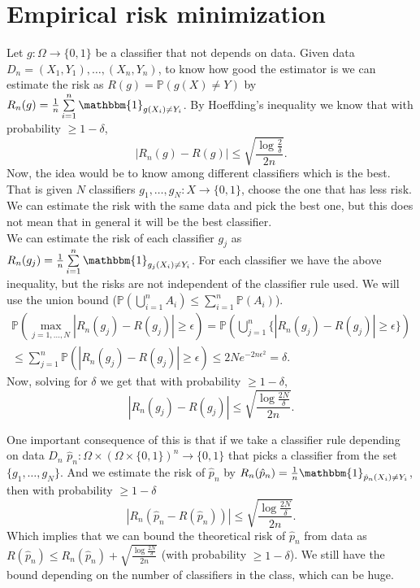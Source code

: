 \documentclass[11pt, english]{article}
\begin{document}
\section{Empirical risk minimization}

Let $g:\Omega\rightarrow\{0,1\}$ be a classifier that not depends on data. Given data $D_n=(X_1,Y_1),\dots,(X_n,Y_n)$, to know how good the estimator is we can estimate the risk as $R(g)=\mathbb{P}(g(X)\neq Y)$ by $R_n(g)=\frac{1}{n}\sum\limits_{i=1}^n\mathbbm{1}_{g(X_i)\neq Y_i}$. By Hoeffding's inequality we know that with probability $\geq 1-\delta$, 
\begin{equation}
	|R_n(g)-R(g)|\leq\sqrt{\frac{\log\frac{2}{\delta}}{2n}}.
\end{equation}
Now, the idea would be to know among different classifiers which is the best. That is given $N$ classifiers $g_1,\dots,g_N: X\rightarrow\{0,1\}$, choose the one that has less risk. We can estimate the risk with the same data and pick the best one, but this does not mean that in general it will be the best classifier.\\

We can estimate the risk of each classifier $g_j$ as $R_n(g_j)=\frac{1}{n}\sum\limits_{i=1}^n \mathbbm{1}_{g_j(X_i)\neq Y_i}$. For each classifier we have the above inequality, but the risks are not independent of the classifier rule used. We will use the union bound ($\mathbb{P}(\bigcup\limits_{i=1}^n A_i)\leq\sum\limits_{i=1}^n\mathbb{P}(A_i)$).
\begin{align}
	\mathbb{P}(\underset{j=1,\dots,N}{\max}|R_n(g_j)-R(g_j)|\geq\epsilon)=\mathbb{P}(\bigcup\limits_{j=1}^n\{|R_n(g_j)-R(g_j)|\geq \epsilon\})\\
	\leq\sum\limits_{j=1}^n\mathbb{P}(|R_n(g_j)-R(g_j)|\geq\epsilon)\leq 2Ne^{-2n\epsilon^2}=\delta.
\end{align}
Now, solving for $\delta$ we get that with probability $\geq 1-\delta$, \begin{equation}
	|R_n(g_j)-R(g_j)|\leq\sqrt{\frac{\log\frac{2 N}{\delta}}{2n}}.
\end{equation}

One important consequence of this is that if we take a classifier rule depending on data $D_n$ $\hat{p}_n:\Omega\times(\Omega\times\{0,1\})^n\rightarrow \{0,1\}$ that picks a classifier from the set $\{g_1,\dots,g_N\}$. And we estimate the risk of $\hat{p}_n$ by $R_n(\hat{p}_n)= \frac{1}{n}\mathbbm{1}_{\hat{p}_n(X_i)\neq Y_i}$, then with probability $\geq 1-\delta$
\begin{equation}
	|R_n(\hat{p}_n-R(\hat{p}_n))|\leq \sqrt{\frac{\log\frac{2N}{\delta}}{2n}}.
	\label{riskbound}
\end{equation}
Which implies that we can bound the theoretical risk of $\hat{p}_n$ from data as $R(\hat{p}_n)\leq R_n(\hat{p}_n)+ \sqrt{\frac{\log\frac{2N}{\delta}}{2n}}$ (with probability $\geq 1-\delta$). We still have the bound depending on the number of classifiers in the class, which can be huge.\\
\end{document}
